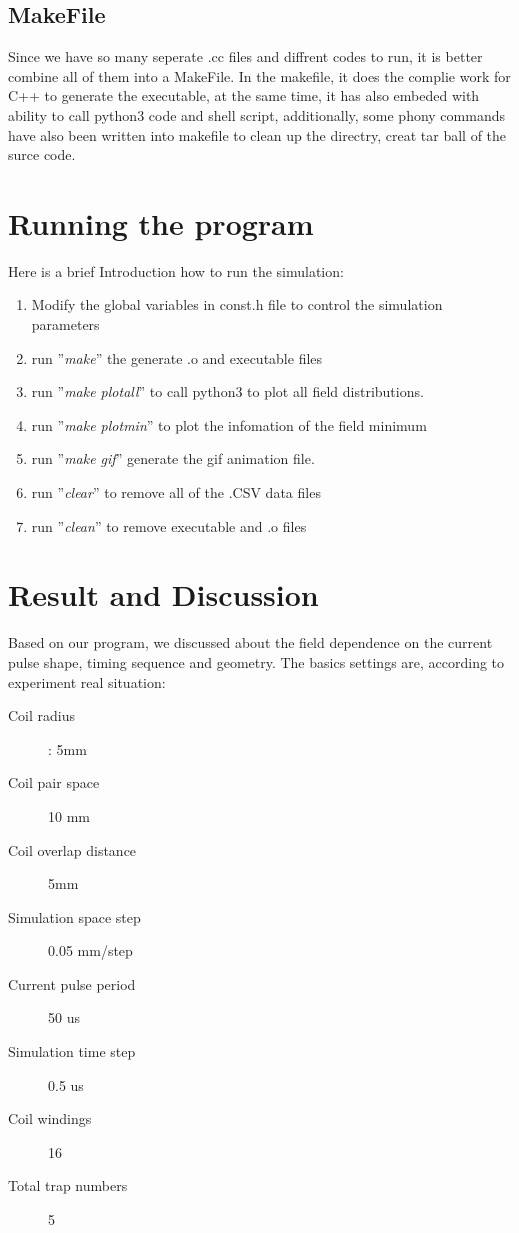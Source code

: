 \documentclass[11pt, xcolor=dvipsnames]{article}
\begin{document}
\subsection{MakeFile}
Since we have so many seperate .cc files and diffrent codes to run, it is better combine all of them into a MakeFile. In the makefile, it does the complie work for C++ to generate the executable, at the same time, it has also embeded with ability to call python3 code and shell script, additionally, some phony commands have also been written into makefile to clean up the directry, creat tar ball of the surce code.

\section{Running the program}
Here is a brief Introduction how to run the simulation:\begin{enumerate} \item Modify the global variables in const.h file to control the simulation parameters \item run ''\textit{make}'' the generate .o and executable files \item run ''\textit{make plotall}'' to call python3 to plot all field distributions. \item run ''\textit{make plotmin}'' to plot the infomation of the field minimum \item run ''\textit{make gif}'' generate the gif animation file. \item run ''\textit{clear}'' to remove all of the .CSV data files \item run ''\textit{clean}'' to remove executable and .o files \end{enumerate}
\section{Result and Discussion}
Based on our program, we discussed about the field dependence on the current pulse shape, timing sequence and geometry. The basics settings are, according to experiment real situation: \begin{description} \item[Coil radius]: 5mm  \item[Coil pair space] 10 mm \item [Coil overlap distance] 5mm  \item[Simulation space step] 0.05 mm/step \item[Current pulse period] 50 us \item[Simulation time step] 0.5 us \item[Coil windings] 16 \item[Total trap numbers] 5 \end{description}
\end{document}
